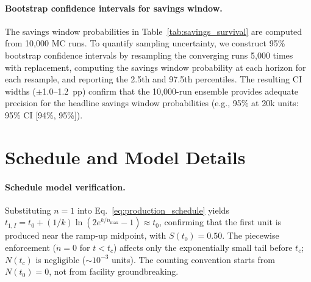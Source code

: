 \documentclass[5p,twocolumn]{elsarticle}
\begin{document}
\paragraph{Bootstrap confidence intervals for savings window.} The savings window probabilities in Table~\ref{tab:savings_survival} are computed from 10{,}000 MC runs. To quantify sampling uncertainty, we construct 95\% bootstrap confidence intervals by resampling the converging runs 5{,}000 times with replacement, computing the savings window probability at each horizon for each resample, and reporting the 2.5th and 97.5th percentiles. The resulting CI widths ($\pm$1.0--1.2~pp) confirm that the 10{,}000-run ensemble provides adequate precision for the headline savings window probabilities (e.g., 95\% at 20k units: 95\% CI [94\%, 95\%]).

\section{Schedule and Model Details}
\label{sec:appendix_schedule}

\paragraph{Schedule model verification.} Substituting $n = 1$ into Eq.~\ref{eq:production_schedule} yields $t_{1,I} = t_0 + (1/k)\ln(2e^{k/\dot{n}_{\max}} - 1) \approx t_0$, confirming that the first unit is produced near the ramp-up midpoint, with $S(t_0) = 0.50$. The piecewise enforcement ($\dot{n} = 0$ for $t < t_c$) affects only the exponentially small tail before $t_c$; $N(t_c)$ is negligible (${\sim}10^{-3}$ units). The counting convention starts from $N(t_0) = 0$, not from facility groundbreaking.

\begin{table}[htbp]
\centering
\caption{Pathway-specific delivery schedules. The gap column shows the additional time ISRU requires relative to Earth delivery of the same unit number.}
\label{tab:production_schedule}
\small
{}
\end{table}
\end{document}
